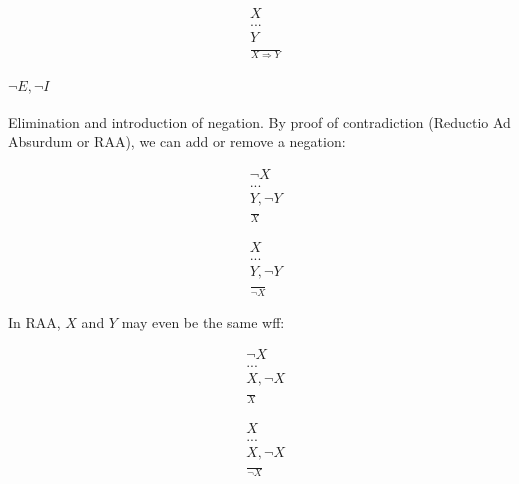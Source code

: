 \documentclass{article}
\begin{document}
\begin{multicols}{2}
  \begin{align*}
   &X \tag*{\tiny Assume}\\
   &...\\
   &Y\\
   &\frac{}{X \Rightarrow Y}
  \end{align*}
  
  \paragraph{$\lnot E, \lnot I$} Elimination and introduction of negation. By proof of contradiction (Reductio Ad Absurdum or RAA), we can add or remove a negation:
  
  \begin{multicols}{2}
  \begin{align*}
   &\lnot X \tag*{\tiny Assume}\\
   &...\\
   &Y, \lnot Y \tag*{\tiny Contradiction}\\ 
   &\frac{}{X}
  \end{align*}

  \break
  
  \begin{align*}
   &X \tag*{\tiny Assume}\\
   &...\\
   &Y, \lnot Y \tag*{\tiny Contradiction}\\ 
   &\frac{}{\lnot X}
  \end{align*}
  \end{multicols}
  
  \noindent In RAA, $X$ and $Y$ may even be the same wff:
  
  \begin{multicols}{2}
  \begin{align*}
   &\lnot X \tag*{\tiny Assume}\\
   &...\\
   &X, \lnot X \tag*{\tiny Contradiction}\\ 
   &\frac{}{X}
  \end{align*}
  
  \break
  
  \begin{align*}
   &X \tag*{\tiny Assume}\\
   &...\\
   &X, \lnot X \tag*{\tiny Contradiction}\\ 
   &\frac{}{\lnot X}
  \end{align*}
  \end{multicols}
  

\end{multicols}
\end{document}
